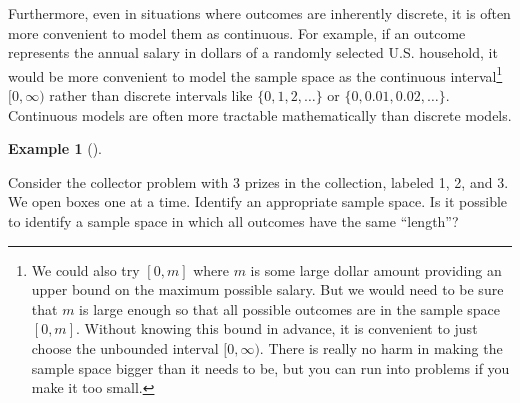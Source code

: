 \documentclass[
  letterpaper,
  DIV=11,
  numbers=noendperiod]{scrreprt}
\theoremstyle{plain}
\theoremstyle{definition}
\newtheorem{example}{Example}[chapter]
\theoremstyle{definition}
\theoremstyle{definition}
\theoremstyle{remark}
\begin{document}
Furthermore, even in situations where outcomes are inherently discrete,
it is often more convenient to model them as continuous. For example, if
an outcome represents the annual salary in dollars of a randomly
selected U.S. household, it would be more convenient to model the sample
space as the continuous interval\footnote{We could also try \([0, m]\)
  where \(m\) is some large dollar amount providing an upper bound on
  the maximum possible salary. But we would need to be sure that \(m\)
  is large enough so that all possible outcomes are in the sample space
  \([0, m]\). Without knowing this bound in advance, it is convenient to
  just choose the unbounded interval \([0, \infty)\). There is really no
  harm in making the sample space bigger than it needs to be, but you
  can run into problems if you make it too small.} \([0, \infty)\)
rather than discrete intervals like \(\{0, 1, 2, \ldots\}\) or
\(\{0, 0.01, 0.02, \ldots\}\). Continuous models are often more
tractable mathematically than discrete models.

\begin{tcolorbox}[enhanced jigsaw, opacityback=0, left=2mm, colframe=quarto-callout-note-color-frame, toprule=.15mm, breakable, colback=white, leftrule=.75mm, arc=.35mm, rightrule=.15mm, bottomrule=.15mm]

\begin{example}[]\protect\hypertarget{exm-collector-outcome}{}\label{exm-collector-outcome}

Consider the collector problem with 3 prizes in the collection, labeled
1, 2, and 3. We open boxes one at a time. Identify an appropriate sample
space. Is it possible to identify a sample space in which all outcomes
have the same ``length''?

\end{example}

\end{tcolorbox}
\end{document}
